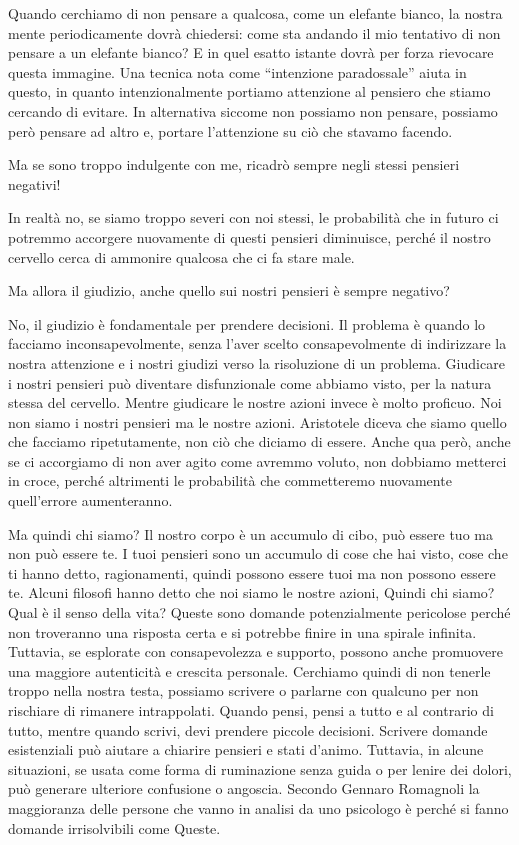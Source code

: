 \documentclass[12pt]{book} %
\begin{document}
Quando cerchiamo di non pensare a qualcosa, come un elefante bianco, la nostra mente periodicamente dovrà chiedersi:
come sta andando il mio tentativo di non pensare a un elefante bianco? E in quel esatto istante dovrà per forza
rievocare questa immagine. Una tecnica nota come “intenzione paradossale” aiuta in questo, in quanto intenzionalmente
portiamo attenzione al pensiero che stiamo cercando di evitare. In alternativa siccome non possiamo non pensare,
possiamo però pensare ad altro e, portare l'attenzione su ciò che stavamo facendo. 

Ma se sono troppo indulgente con me, ricadrò sempre negli stessi pensieri negativi! 

In realtà no, se siamo troppo severi con noi stessi, le probabilità che in futuro ci potremmo accorgere nuovamente di
questi pensieri diminuisce, perché il nostro cervello cerca di ammonire qualcosa che ci fa stare male. 

Ma allora il giudizio, anche quello sui nostri pensieri è sempre negativo?

No, il giudizio è fondamentale per prendere decisioni. Il problema è quando lo facciamo inconsapevolmente, senza
l'aver scelto consapevolmente di indirizzare la nostra attenzione e i nostri giudizi verso la
risoluzione di un problema. Giudicare i nostri pensieri può diventare disfunzionale come abbiamo visto, per la natura stessa del
cervello. Mentre giudicare le nostre azioni invece è molto proficuo. Noi non siamo i nostri pensieri ma le nostre
azioni. Aristotele diceva che siamo quello che facciamo ripetutamente, non ciò che diciamo di essere. Anche qua però, anche se ci accorgiamo di non aver agito come avremmo voluto, non dobbiamo metterci in croce, perché altrimenti le probabilità che commetteremo nuovamente quell'errore aumenteranno. 

Ma quindi chi siamo? Il nostro corpo è un accumulo di cibo, può essere tuo ma non può essere te. I tuoi pensieri sono un
accumulo di cose che hai visto, cose che ti hanno detto, ragionamenti, quindi possono essere tuoi ma non possono essere
te. Alcuni filosofi hanno detto che noi siamo le nostre azioni, Quindi chi siamo? Qual è il senso della vita? Queste sono domande
potenzialmente pericolose perché non troveranno una risposta certa e si potrebbe finire in una spirale infinita. Tuttavia, se esplorate con consapevolezza e supporto, possono anche promuovere una maggiore autenticità e crescita personale. Cerchiamo quindi di non tenerle troppo nella nostra testa, possiamo scrivere o parlarne con qualcuno per non rischiare di rimanere intrappolati. Quando pensi, pensi a tutto e al contrario di tutto, mentre quando scrivi, devi prendere piccole decisioni. Scrivere domande esistenziali può aiutare a chiarire pensieri e stati d’animo. Tuttavia, in alcune situazioni, se usata come forma di ruminazione senza guida o per lenire dei dolori, può generare ulteriore confusione o angoscia. 
Secondo Gennaro Romagnoli la maggioranza delle persone che vanno in analisi da uno psicologo è perché si fanno domande irrisolvibili come Queste.
\end{document}
